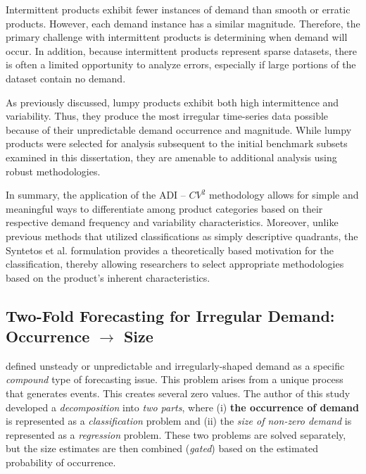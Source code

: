 Intermittent products exhibit fewer instances of demand than smooth or erratic products. However, each demand instance has a similar magnitude. Therefore, the primary challenge with intermittent products is determining when demand will occur. In addition, because intermittent products represent sparse datasets, there is often a limited opportunity to analyze errors, especially if large portions of the dataset contain no demand.

As previously discussed, lumpy products exhibit both high intermittence and variability. Thus, they produce the most irregular time-series data possible because of their unpredictable demand occurrence and magnitude. While lumpy products were selected for analysis subsequent to the initial benchmark subsets examined in this dissertation, they are amenable to additional analysis using robust methodologies.

In summary, the application of the ADI -- $CV^2$ methodology allows for simple and meaningful ways to differentiate among product categories based on their respective demand frequency and variability characteristics. Moreover, unlike previous methods that utilized classifications as simply descriptive quadrants, the Syntetos et al. formulation provides a theoretically based motivation for the classification, thereby allowing researchers to select appropriate methodologies based on the product's inherent characteristics.

\subsection{Two-Fold Forecasting for Irregular Demand: Occurrence \texorpdfstring{$\rightarrow$}{->} Size}
\label{sec:two-fold-approach-rozanec}

\label{sec:two-fold-approach-rozanec}

\cite{reframingdemandforecastingtwofold} defined unsteady or unpredictable and irregularly-shaped demand as a specific \emph{compound} type of forecasting issue. This problem arises from a unique process that generates events. This creates several zero values. The author of this study developed a \emph{decomposition} into \emph{two parts}, where (i) \textbf{the occurrence of demand} is represented as a \emph{classification} problem and (ii) the \emph{size of non-zero demand} is represented as a \emph{regression} problem. These two problems are solved separately, but the size estimates are then combined (\emph{gated}) based on the estimated probability of occurrence.

